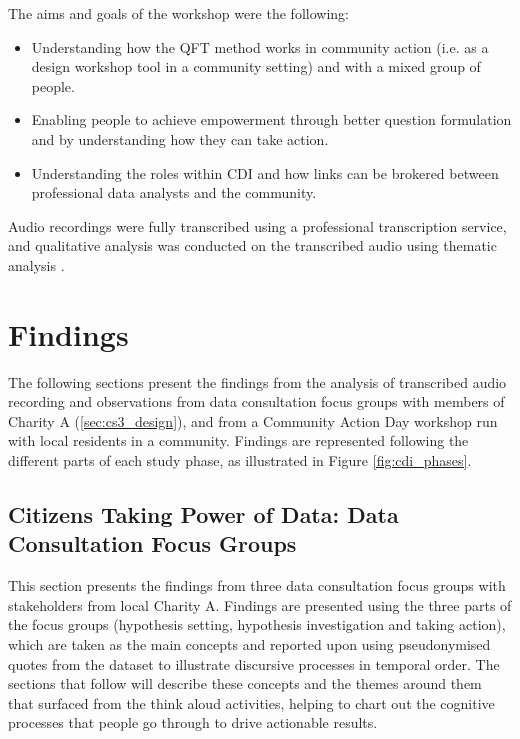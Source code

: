 The aims and goals of the workshop were the following:
\begin{itemize}
    \item Understanding how the QFT method works in community action (i.e. as a design workshop tool in a community setting) and with a mixed group of people.
    \item Enabling people to achieve empowerment through better question formulation and by understanding how they can take action.
    \item Understanding the roles within CDI and how links can be brokered between professional data analysts and the community.
\end{itemize}

Audio recordings were fully transcribed using a professional transcription service, and qualitative analysis was conducted on the transcribed audio using thematic analysis \citep{braun_using_2006}.

\section{Findings}
The following sections present the findings from the analysis of transcribed audio recording and observations from data consultation focus groups with members of Charity A (\ref{sec:cs3_design}), and from a Community Action Day workshop run with local residents in a community. Findings are represented following the different parts of each study phase, as illustrated in Figure \ref{fig:cdi_phases}.

\subsection[Citizens Taking Power of Data]{Citizens Taking Power of Data: Data Consultation Focus Groups}
\label{subs:data_consultations}
This section presents the findings from three data consultation focus groups with stakeholders from local Charity A. Findings are presented using the three parts of the focus groups (hypothesis setting, hypothesis investigation and taking action), which are taken as the main concepts and reported upon using pseudonymised quotes from the dataset to illustrate discursive processes in temporal order. The sections that follow will describe these concepts and the themes around them that surfaced from the think aloud activities, helping to chart out the cognitive processes that people go through to drive actionable results.

